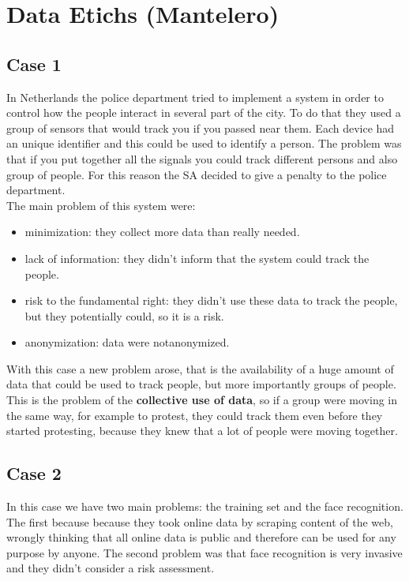 \section{Data Etichs (Mantelero)}
\subsection{Case 1}
In Netherlands the police department tried to implement a system in order to control how the people interact in several part of the city. To do that they used a group of sensors that would track you if you passed near them. Each device had an unique identifier and this could be used to identify a person. The problem was that if you put together all the signals you could track different persons and also group of people. For this reason the SA decided to give a penalty to the police department.\\
The main problem of this system were:
\begin{itemize}
    \item minimization: they collect more data than really needed.
    \item lack of information: they didn't inform that the system could track the people.
    \item risk to the fundamental right: they didn't use these data to track the people, but they potentially could, so it is a risk.
    \item anonymization: data were notanonymized.
\end{itemize}
With this case a new problem arose, that is the availability of a huge amount of data that could be used to track people, but more importantly groups of people. This is the problem of the \textbf{collective use of data}, so if a group were moving in the same way, for example to protest, they could track them even before they started protesting, because they knew that a lot of people were moving together.

\subsection{Case 2}
In this case we have two main problems: the training set and the face recognition.
The first because because they took online data by scraping content of the web, wrongly thinking that all online data is public and therefore can be used for any purpose by anyone.
The second problem was that face recognition is very invasive and they didn't consider a risk assessment.

